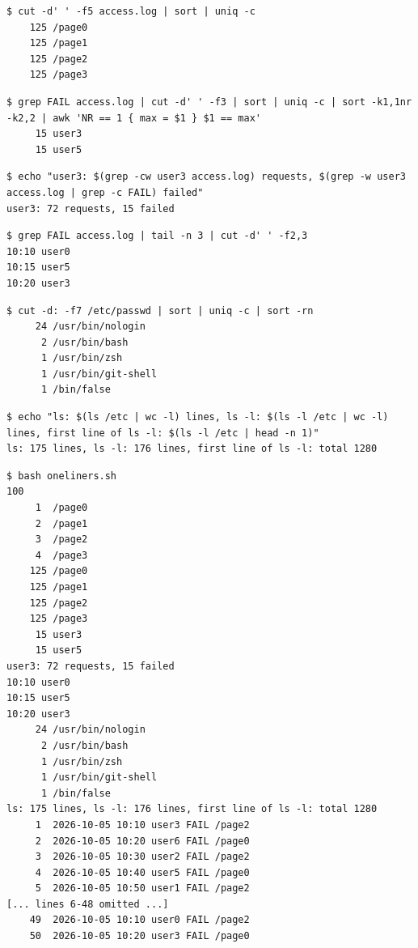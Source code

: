 \documentclass[11pt,a4paper]{article}
\begin{document}
\begin{lstlisting}[caption={Requests per page}]
$ cut -d' ' -f5 access.log | sort | uniq -c
    125 /page0
    125 /page1
    125 /page2
    125 /page3
\end{lstlisting}

\begin{lstlisting}[caption={Users with the most failed requests}]
$ grep FAIL access.log | cut -d' ' -f3 | sort | uniq -c | sort -k1,1nr -k2,2 | awk 'NR == 1 { max = $1 } $1 == max'
     15 user3
     15 user5
\end{lstlisting}

\begin{lstlisting}[caption={Requests and failures of user3}]
$ echo "user3: $(grep -cw user3 access.log) requests, $(grep -w user3 access.log | grep -c FAIL) failed"
user3: 72 requests, 15 failed
\end{lstlisting}

\begin{lstlisting}[caption={The last 3 failed requests, time and user}]
$ grep FAIL access.log | tail -n 3 | cut -d' ' -f2,3
10:10 user0
10:15 user5
10:20 user3
\end{lstlisting}

\begin{lstlisting}[caption={Login shells in /etc/passwd}]
$ cut -d: -f7 /etc/passwd | sort | uniq -c | sort -rn
     24 /usr/bin/nologin
      2 /usr/bin/bash
      1 /usr/bin/zsh
      1 /usr/bin/git-shell
      1 /bin/false
\end{lstlisting}

\begin{lstlisting}[caption={ls and ls -l line counts}]
$ echo "ls: $(ls /etc | wc -l) lines, ls -l: $(ls -l /etc | wc -l) lines, first line of ls -l: $(ls -l /etc | head -n 1)"
ls: 175 lines, ls -l: 176 lines, first line of ls -l: total 1280
\end{lstlisting}

\begin{lstlisting}[caption={Full run of oneliners.sh (bonus lines 6--48 omitted)}]
$ bash oneliners.sh
100
     1  /page0
     2  /page1
     3  /page2
     4  /page3
    125 /page0
    125 /page1
    125 /page2
    125 /page3
     15 user3
     15 user5
user3: 72 requests, 15 failed
10:10 user0
10:15 user5
10:20 user3
     24 /usr/bin/nologin
      2 /usr/bin/bash
      1 /usr/bin/zsh
      1 /usr/bin/git-shell
      1 /bin/false
ls: 175 lines, ls -l: 176 lines, first line of ls -l: total 1280
     1  2026-10-05 10:10 user3 FAIL /page2
     2  2026-10-05 10:20 user6 FAIL /page0
     3  2026-10-05 10:30 user2 FAIL /page2
     4  2026-10-05 10:40 user5 FAIL /page0
     5  2026-10-05 10:50 user1 FAIL /page2
[... lines 6-48 omitted ...]
    49  2026-10-05 10:10 user0 FAIL /page2
    50  2026-10-05 10:20 user3 FAIL /page0
\end{lstlisting}
\end{document}
